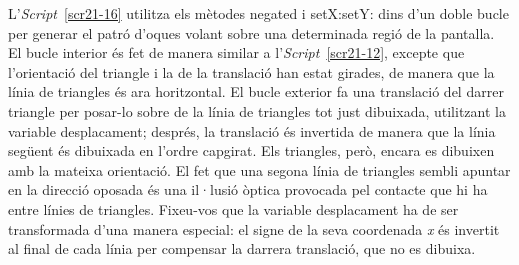 
L'\emph{Script}~\ref{scr21-16} utilitza els mètodes \textsf{negated} i \textsf{setX:setY:} dins d'un doble bucle per generar el patró d'oques volant sobre una determinada regió de la pantalla. El bucle interior és fet de manera similar a l'\emph{Script}~\ref{scr21-12}, excepte que l'orientació del triangle i la de la translació han estat girades, de manera que la línia de triangles és ara horitzontal. El bucle exterior fa una translació del darrer triangle per posar-lo sobre de la línia de triangles tot just dibuixada, utilitzant la variable \textsf{desplacament}; després, la translació és invertida de manera que la línia següent és dibuixada en l'ordre capgirat. Els triangles, però, encara es dibuixen amb la mateixa orientació. El fet que una segona línia de triangles sembli apuntar en la direcció oposada és una il·lusió òptica provocada pel contacte que hi ha entre línies de triangles. Fixeu-vos que la variable \textsf{desplacament} ha de ser transformada d'una manera especial: el signe de la seva coordenada \emph{x} és invertit al final de cada línia per compensar la darrera translació, que no es dibuixa.  

